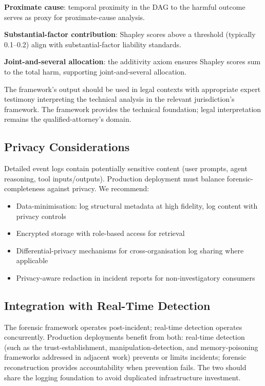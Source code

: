 \documentclass[sigconf,nonacm]{acmart}
\begin{document}
\textbf{Proximate cause}: temporal proximity in the DAG to the
harmful outcome serves as proxy for proximate-cause analysis.

\textbf{Substantial-factor contribution}: Shapley scores above a
threshold (typically 0.1--0.2) align with substantial-factor
liability standards.

\textbf{Joint-and-several allocation}: the additivity axiom
ensures Shapley scores sum to the total harm, supporting
joint-and-several allocation.

The framework's output should be used in legal contexts with
appropriate expert testimony interpreting the technical analysis
in the relevant jurisdiction's framework. The framework provides
the technical foundation; legal interpretation remains the
qualified-attorney's domain.

\subsection{Privacy Considerations}

Detailed event logs contain potentially sensitive content (user
prompts, agent reasoning, tool inputs/outputs). Production
deployment must balance forensic-completeness against
privacy. We recommend:

\begin{itemize}
  \item Data-minimisation: log structural metadata at high
        fidelity, log content with privacy controls
  \item Encrypted storage with role-based access for retrieval
  \item Differential-privacy mechanisms for cross-organisation
        log sharing where applicable
  \item Privacy-aware redaction in incident reports for
        non-investigatory consumers
\end{itemize}

\subsection{Integration with Real-Time Detection}

The forensic framework operates post-incident; real-time detection
operates concurrently. Production deployments benefit from both:
real-time detection (such as the trust-establishment, manipulation-detection,
and memory-poisoning frameworks addressed in adjacent work) prevents
or limits incidents; forensic reconstruction provides accountability
when prevention fails. The two should share the logging foundation
to avoid duplicated infrastructure investment.
\end{document}
